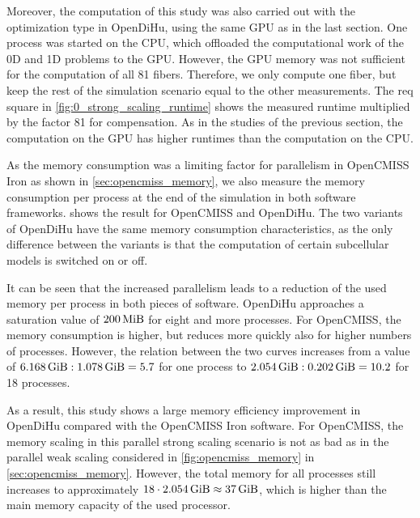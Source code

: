 Moreover, the computation of this study was also carried out with the  optimization type in OpenDiHu, using the same GPU as in the last section. One process was started on the CPU, which offloaded the computational work of the 0D and 1D problems to the GPU. However, the GPU memory was not sufficient for the computation of all 81 fibers. Therefore, we only compute one fiber, but keep the rest of the simulation scenario equal to the other measurements. The req square in \cref{fig:0_strong_scaling_runtime} shows the measured runtime multiplied by the factor 81 for compensation. As in the studies of the previous section, the computation on the GPU has higher runtimes than the computation on the CPU.

As the memory consumption was a limiting factor for parallelism in OpenCMISS Iron as shown in \cref{sec:opencmiss_memory}, we also measure the memory consumption per process at the end of the simulation in both software frameworks.  shows the result for OpenCMISS and OpenDiHu. The two variants of OpenDiHu have the same memory consumption characteristics, as the only difference between the variants is that the computation of certain subcellular models is switched on or off. 

It can be seen that the increased parallelism leads to a reduction of the used memory per process in both pieces of software. OpenDiHu approaches a saturation value of $\SI{200}{\mebi\byte}$ for eight and more processes. For OpenCMISS, the memory consumption is higher, but reduces more quickly also for higher numbers of processes. However, the relation between the two curves increases from a value of $\SI{6.168}{\gibi\byte} : \SI{1.078}{\gibi\byte} = 5.7$ for one process to $\SI{2.054}{\gibi\byte} : \SI{0.202}{\gibi\byte} = 10.2$ for 18 processes.

As a result, this study shows a large memory efficiency improvement in OpenDiHu compared with the OpenCMISS Iron software. For OpenCMISS, the memory scaling in this parallel strong scaling scenario is not as bad as in the parallel weak scaling considered in \cref{fig:opencmiss_memory} in \cref{sec:opencmiss_memory}. However, the total memory for all processes still increases to approximately $18 \cdot \SI{2.054}{\gibi\byte} \approx \SI{37}{\gibi\byte}$, which is higher than the main memory capacity of the used processor.

